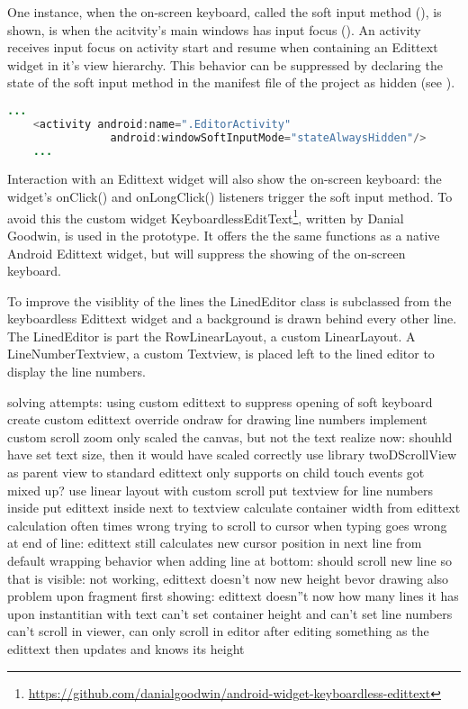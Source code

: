 One instance, when the on-screen keyboard, called the soft input method (\cite{android_softinputmethod}), is shown, is when the acitvity's main windows has input focus (\cite{android_windowsoftinputmode_docs}). An activity receives input focus on activity start and resume when containing an Edittext widget in it's view hierarchy. This behavior can be suppressed by declaring the state of the soft input method in the manifest file of the project as hidden (see ).

\begin{lstlisting}[language=JAVA, caption=Declaring on-screen keyboard hidden in manifest file., label=lst:inputstate_hidden_manifest]
	...
	<activity android:name=".EditorActivity"
	            android:windowSoftInputMode="stateAlwaysHidden"/>
	...
\end{lstlisting}

Interaction with an Edittext widget will also show the on-screen keyboard: the widget's onClick() and onLongClick() listeners trigger the soft input method. To avoid this the custom widget KeyboardlessEditText\footnote{\url{https://github.com/danialgoodwin/android-widget-keyboardless-edittext}}, written by Danial Goodwin, is used in the prototype. It offers the the same functions as a native Android Edittext widget, but will suppress the showing of the on-screen keyboard.

To improve the visiblity of the lines the LinedEditor class is subclassed from the keyboardless Edittext widget and a background is drawn behind every other line. The LinedEditor is part the RowLinearLayout, a custom LinearLayout. A LineNumberTextview, a custom Textview, is placed left to the lined editor to display the line numbers.


solving attempts:
	using custom edittext to suppress opening of soft keyboard  
	create custom edittext 
		override ondraw for drawing line numbers
		implement custom scroll
		zoom only scaled the canvas, but not the text
		realize now: shouhld have set text size, then it would have scaled correctly
	use library twoDScrollView as parent view to standard edittext
		only supports on child
		touch events got mixed up?
	use linear layout with custom scroll
		put textview for line numbers inside
		put edittext inside next to textview
		calculate container width from edittext
		calculation often times wrong
		trying to scroll to cursor when typing goes wrong at end of line: edittext still calculates new cursor position in next line from default wrapping behavior
		when adding line at bottom: should scroll new line so that is visible: not working, edittext doesn't now new height bevor drawing
		also problem upon fragment first showing: edittext doesn''t now how many lines it has upon instantitian with text 
		can't set container height and can't set line numbers
		can't scroll in viewer, can only scroll in editor after editing something as the edittext then updates and knows its height

